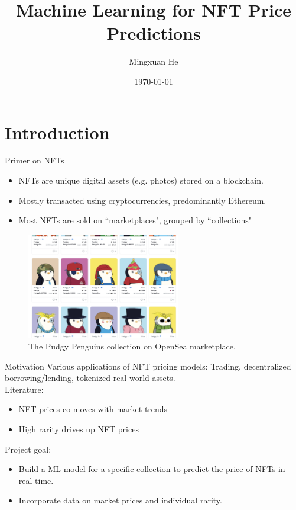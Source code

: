 \documentclass{beamer}
\title[DL for NFT Pricing]{Machine Learning for NFT Price Predictions}
\author{Mingxuan He}
\institute[]{
Booth School of Business, University of Chicago\\
mingxuanh@uchicago.edu
}
\date{\today}
\begin{document}
\begin{frame}
\titlepage  
\end{frame}


\section{Introduction}

\begin{frame}{Primer on NFTs}
    \begin{itemize}
        \item NFTs are unique digital assets (e.g. photos) stored on a blockchain.
        \item Mostly transacted using cryptocurrencies, predominantly Ethereum.
        \item Most NFTs are sold on ``marketplaces", grouped by ``collections"
    \end{itemize}
    \begin{figure}
        \includegraphics[width=0.6\textwidth]{../figures/penguins.png}
        \caption{\footnotesize{The Pudgy Penguins collection on OpenSea marketplace.}}
    \end{figure}
\end{frame}

\begin{frame}{Motivation}
    Various applications of NFT pricing models: Trading, decentralized borrowing/lending, tokenized real-world assets.\\
    \bigskip
    Literature:
    \begin{itemize}
        \item NFT prices co-moves with market trends \citep{nadini2021mapping,kong2021alternative,jain2022nft,kapoor2022tweetboost}
        \item High rarity drives up NFT prices \citep{mekacher2022heterogeneous,kong2021alternative}
    \end{itemize}

    Project goal:
    \begin{itemize}
        \item Build a ML model for a specific collection to predict the price of NFTs in real-time.
        \item Incorporate data on market prices and individual rarity.

    \end{itemize}
\end{frame}
\end{document}
